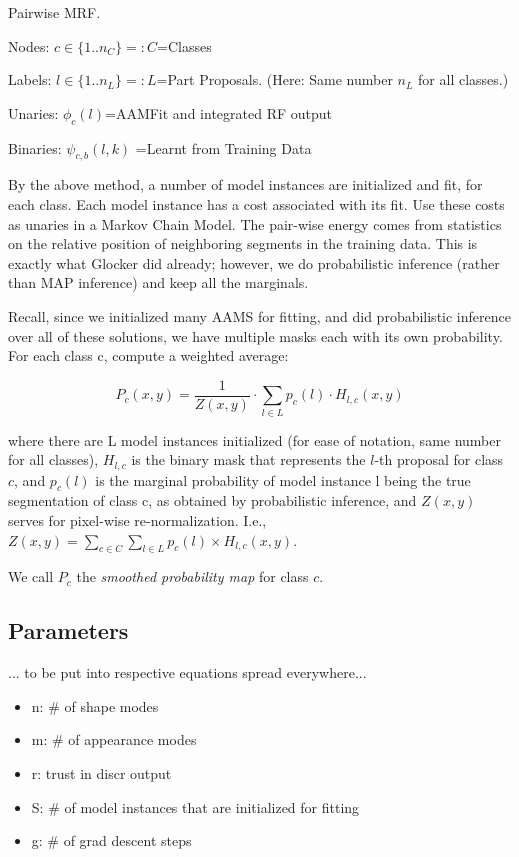 \documentclass[10pt,twocolumn,letterpaper]{article}
\begin{document}
Pairwise MRF.

Nodes: $c\in \{1..n_C\}=:C$=Classes

Labels: $l\in \{1..n_L\}=:L$=Part Proposals. (Here: Same number $n_L$ for all classes.)

Unaries: $\phi_c(l)$=AAMFit and integrated RF output

Binaries: $\psi_{c,b}(l,k)$ =Learnt from Training Data

By the above method, a number of model instances are initialized and fit, for each class.  Each model instance has a cost associated with its fit.  Use these costs as unaries in a Markov Chain Model.  The pair-wise energy comes from statistics on the relative position of neighboring segments in the training data.  This is exactly what Glocker did already; however, we do probabilistic inference (rather than MAP inference) and keep all the marginals.

Recall, since we initialized many AAMS for fitting, and did probabilistic inference over all of these solutions, we have multiple masks each with its own probability.  For each class c, compute a weighted average:

\[ P_c(x,y) = \frac{1}{Z(x,y)} \cdot \sum_{l\in L} p_c(l)\cdot H_{l,c}(x,y) \]

where there are L model instances initialized (for ease of notation, same number for all classes), $H_{l,c}$ is the binary mask that represents the $l$-th proposal for class $c$, and $p_c(l)$ is the marginal probability of model instance l being the true segmentation of class c, as obtained by probabilistic inference, and $Z(x,y)$ serves for pixel-wise re-normalization. I.e., $Z(x,y)=\sum_{c\in C}\sum_{l\in L} p_c(l)\times H_{l,c}(x,y)$.

We call $P_c$ the \emph{smoothed probability map} for class $c$. 

\subsection{Parameters}
... to be put into respective equations spread everywhere...
\begin{itemize}
\item n: \# of shape modes
\item m: \# of appearance modes
\item r: trust in discr output
\item S: \# of model instances that are initialized for fitting
\item g: \# of grad descent steps
\end{itemize}
\end{document}
